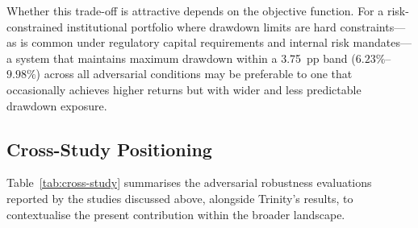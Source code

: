 Whether this trade-off is attractive depends on the objective function. For
a risk-constrained institutional portfolio where drawdown limits are hard
constraints---as is common under regulatory capital requirements and internal
risk mandates---a system that maintains maximum drawdown within a 3.75~pp
band ($6.23\%$--$9.98\%$) across all adversarial conditions may be preferable
to one that occasionally achieves higher returns but with wider and less
predictable drawdown exposure.

\subsection{Cross-Study Positioning}
\label{sec:disc-cross-study}

Table~\ref{tab:cross-study} summarises the adversarial robustness evaluations
reported by the studies discussed above, alongside Trinity's results, to
contextualise the present contribution within the broader landscape.

